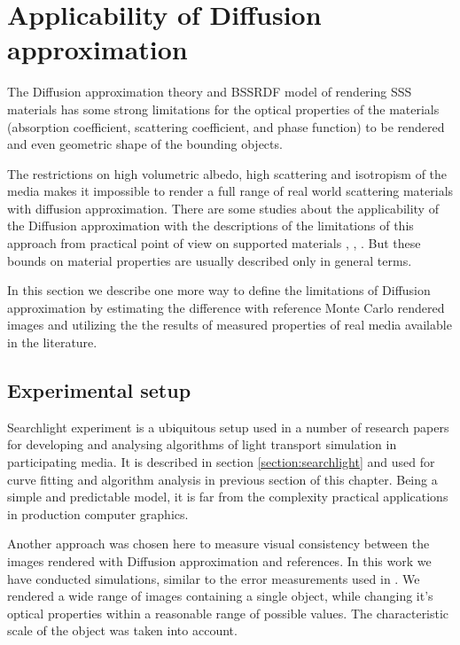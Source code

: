 \newpage
\section{Applicability of Diffusion approximation}
\label{chapter:measurements}

The Diffusion approximation theory and BSSRDF model of rendering SSS materials has some strong
limitations for the optical properties of the materials (absorption coefficient, scattering
coefficient, and phase function) to be rendered and even geometric shape of the bounding
objects.

The restrictions on high volumetric albedo, high scattering and isotropism of the media makes it
impossible to render a full range of real world scattering materials with diffusion approximation.
There are some studies about the applicability of the Diffusion approximation with the descriptions
of the limitations of this approach from practical point of view on supported materials
\cite{Donner:2009:EBM}, \cite{Gkioulekas:2013:URP:2516971.2516972},
\cite{Zhao:2014:HSR:2601097.2601104}. But these bounds on material properties are usually described
only in general terms.

In this section we describe one more way to define the limitations of Diffusion approximation  by
estimating the difference with reference Monte Carlo rendered images and utilizing the the results
of measured properties of real media available in the literature.

\subsection{Experimental setup}
Searchlight experiment is a ubiquitous setup used in a number of research papers for developing
and analysing algorithms of light transport simulation in participating media. It is described in
section \ref{section:searchlight} and used for curve fitting and algorithm analysis in previous
section of this chapter. Being a simple and predictable model, it is far from the complexity
practical applications in production computer graphics.

Another approach was chosen here to measure visual consistency between the images rendered with
Diffusion approximation and references. In this work we have conducted simulations, similar to the
error measurements used in \cite{Zhao:2014:HSR:2601097.2601104}. We rendered a wide range of
images containing a single object, while changing it's optical properties within a reasonable range
of possible values. The characteristic scale of the object was taken into account.

